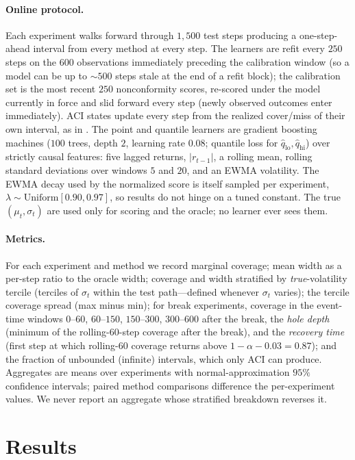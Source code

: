 \documentclass[11pt]{article}
\begin{document}
\paragraph{Online protocol.} Each experiment walks forward through
$1{,}500$ test steps producing a one-step-ahead interval from every method at
every step. The learners are refit every $250$ steps on the $600$
observations immediately preceding the calibration window (so a model can be
up to ${\sim}500$ steps stale at the end of a refit block); the calibration
set is the most recent $250$ nonconformity
scores, re-scored under the model currently in force and slid forward every
step (newly observed outcomes enter immediately). ACI states update every
step from the realized cover/miss of their own interval, as in
\citet{gibbs2021adaptive}. The point and quantile learners are gradient
boosting machines ($100$ trees, depth $2$, learning rate $0.08$; quantile loss
for $\hat{q}_{\mathrm{lo}},\hat{q}_{\mathrm{hi}}$) over strictly causal
features: five lagged returns, $|r_{t-1}|$, a rolling mean, rolling standard
deviations over windows $5$ and $20$, and an EWMA volatility. The EWMA decay
used by the normalized score is itself sampled per experiment,
$\lambda\sim\mathrm{Uniform}[0.90,0.97]$, so results do not hinge on a tuned
constant. The true $(\mu_t,\sigma_t)$ are used only for scoring and the
oracle; no learner ever sees them.

\paragraph{Metrics.} For each experiment and method we record marginal
coverage; mean width as a per-step ratio to the oracle width; coverage and
width stratified by \emph{true}-volatility tercile (terciles of $\sigma_t$
within the test path---defined whenever $\sigma_t$ varies); the tercile
coverage spread (max minus min); for break experiments, coverage in the
event-time windows $0$--$60$, $60$--$150$, $150$--$300$, $300$--$600$ after
the break, the \emph{hole depth} (minimum of the rolling-$60$-step coverage
after the break), and the \emph{recovery time} (first step at which
rolling-$60$ coverage returns above $1-\alpha-0.03=0.87$); and the fraction
of unbounded (infinite) intervals, which only ACI can produce. Aggregates are
means over experiments with normal-approximation $95\%$ confidence intervals;
paired method comparisons difference the per-experiment values. We never
report an aggregate whose stratified breakdown reverses it.

\section{Results}
\label{sec:results}
\end{document}
